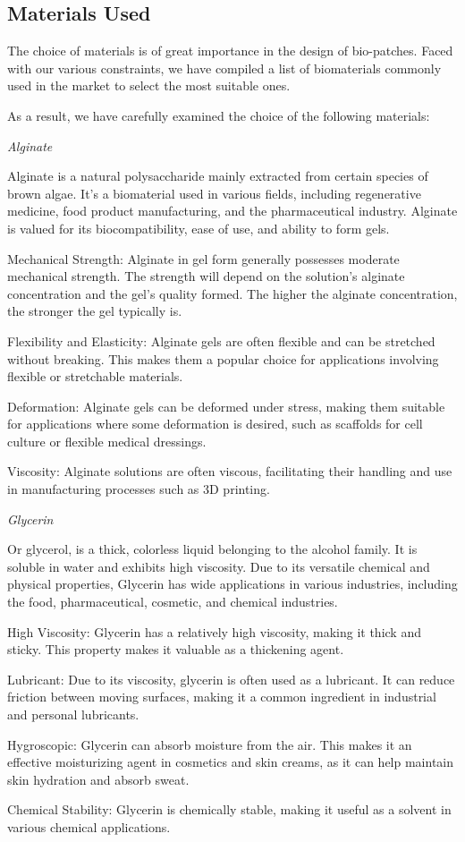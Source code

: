 \subsection{Materials Used}
The choice of materials is of great importance in the design of bio-patches. Faced with our various constraints, we have compiled a list of biomaterials commonly used in the market to select the most suitable ones.

As a result, we have carefully examined the choice of the following materials:

\textit{Alginate}

Alginate is a natural polysaccharide mainly extracted from certain species of brown algae. It’s a biomaterial used in various fields, including regenerative medicine, food product manufacturing, and the pharmaceutical industry. Alginate is valued for its biocompatibility, ease of use, and ability to form gels.
\item Mechanical Strength: Alginate in gel form generally possesses moderate mechanical strength. The strength will depend on the solution's alginate concentration and the gel's quality formed. The higher the alginate concentration, the stronger the gel typically is.
\item Flexibility and Elasticity: Alginate gels are often flexible and can be stretched without breaking. This makes them a popular choice for applications involving flexible or stretchable materials.
\item Deformation: Alginate gels can be deformed under stress, making them suitable for applications where some deformation is desired, such as scaffolds for cell culture or flexible medical dressings.
\item Viscosity: Alginate solutions are often viscous, facilitating their handling and use in manufacturing processes such as 3D printing.

\textit{Glycerin}

Or glycerol, is a thick, colorless liquid belonging to the alcohol family. It is soluble in water and exhibits high viscosity. Due to its versatile chemical and physical properties, Glycerin has wide applications in various industries, including the food, pharmaceutical, cosmetic, and chemical industries.
\item High Viscosity: Glycerin has a relatively high viscosity, making it thick and sticky. This property makes it valuable as a thickening agent.
\item Lubricant: Due to its viscosity, glycerin is often used as a lubricant. It can reduce friction between moving surfaces, making it a common ingredient in industrial and personal lubricants.
\item Hygroscopic: Glycerin can absorb moisture from the air. This makes it an effective moisturizing agent in cosmetics and skin creams, as it can help maintain skin hydration and absorb sweat.
\item Chemical Stability: Glycerin is chemically stable, making it useful as a solvent in various chemical applications.

